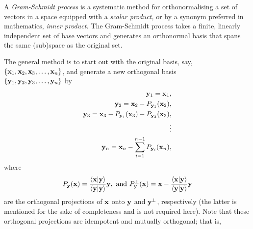 A {\em Gram-Schmidt process} is a systematic method for orthonormalising a set of vectors
in a space equipped with a {\em scalar product,}
or by a synonym preferred in mathematics, {\em inner product.}
The Gram-Schmidt process takes a finite, linearly independent set
of base vectors
and generates an orthonormal basis that spans the same (sub)space as the original set.

The general method is to start out with the original basis,
say,  \\
$\{
{\bf x}_1,
{\bf x}_2,
{\bf x}_3,
\ldots ,
{\bf x}_n
\}$,
and generate a new orthogonal basis \\
$\{
{\bf y}_1,
{\bf y}_2,
{\bf y}_3,
\ldots ,
{\bf y}_n
\}$
by
\begin{equation}
\begin{split}
{\bf y}_1={\bf x}_1,\\
{\bf y}_2={\bf x}_2 - P_{{\bf y}_1}({\bf x}_2),\\
{\bf y}_3={\bf x}_3 - P_{{\bf y}_1}({\bf x}_3)- P_{{\bf y}_2}({\bf x}_3),\\
 \vdots \\
{\bf y}_n={\bf x}_n -\sum_{i=1}^{n-1} P_{{\bf y}_i}({\bf x}_n),
\end{split}
\end{equation}
where
\begin{equation}
P_{{\bf y}}({\bf x}) =
\frac{\langle {\bf x}\vert {\bf y} \rangle }
{\langle {\bf y}\vert {\bf y} \rangle }
{\bf y}
,\textrm{ and }
P_{{\bf y}}^\perp ({\bf x}) = {\bf x} -
\frac{\langle {\bf x}\vert {\bf y} \rangle }
{\langle {\bf y}\vert {\bf y} \rangle }
{\bf y}
\end{equation}
are the orthogonal projections of ${\bf x}$ onto ${\bf y}$ and ${\bf y}^\perp$, respectively
(the latter is mentioned for the sake of completeness and is not required here).
\label{2011-m-gsp}
Note that these orthogonal projections are idempotent
and mutually orthogonal; that is,
